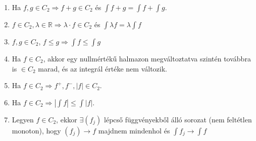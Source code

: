 \documentclass[12pt,a4paper]{scrartcl}
\providecommand{\tightlist}{%
  \setlength{\itemsep}{0pt}\setlength{\parskip}{0pt}}
\begin{document}
\begin{enumerate}
\def\labelenumi{\arabic{enumi}.}
\tightlist
\item
  Ha \(\left. f,g \in C_{2}\Rightarrow f + g \in C_{2} \right.\) és
  \({\int{f + g}} = {\int f} + {\int g}\).
\item
  \(\left. f \in C_{2},\lambda \in {\mathbb{R}}\Rightarrow\lambda \cdot f \in C_{2} \right.\)
  és \({\int{\lambda f}} = \lambda{\int f}\)
\item
  \(f,g \in C_{2}\),
  \(\left. f \leq g\Rightarrow{\int f} \leq {\int g} \right.\)
\item
  Ha \(f \in C_{2}\), akkor egy nullmértékű halmazon megváltoztatva
  szintén továbbra is \(\in C_{2}\) marad, és az integrál értéke nem
  változik.
\item
  Ha
  \(\left. f \in C_{2}\Rightarrow f^{+},f^{-},\left| f \right| \in C_{2} \right.\).
\item
  Ha
  \(\left. f \in C_{2}\Rightarrow\left| {\int f} \right| \leq {\int\left| f \right|} \right.\).
\item
  Legyen \(f \in C_{2}\), ekkor \(\exists\left( f_{j} \right)\) lépcső
  függvényekből álló sorozat (nem feltétlen monoton), hogy
  \(\left. \left( f_{j} \right)\rightarrow f \right.\) majdnem mindenhol
  és \(\left. {\int f_{j}}\rightarrow{\int f} \right.\)
\end{enumerate}
\end{document}
